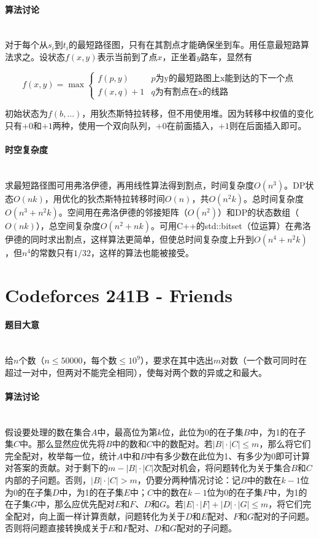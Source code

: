 \documentclass[UTF8]{ctexart}
\newcommand{\myparagraph}[1]{\paragraph{#1}\mbox{}\\}
\theoremstyle{nonumberplain}
\begin{document}
		\myparagraph{算法讨论}
		
			对于每个从$s_i$到$t_i$的最短路径图，只有在其割点才能确保坐到车。用任意最短路算法求之。设状态$f(x,y)$表示当前到了点$x$，正坐着$y$路车，显然有
			
			$$f(x,y)=\max\left\{\begin{array}{lr}
				f(p,y) & p\mbox{为y的最短路图上x能到达的下一个点} \\
				f(x,q)+1 & q\mbox{为有割点在x的线路}
				\end{array}\right.$$
			
			初始状态为$f(b,...)$，用狄杰斯特拉转移，但不用使用堆。因为转移中权值的变化只有$+0$和$+1$两种，使用一个双向队列，$+0$在前面插入，$+1$则在后面插入即可。
		
		\myparagraph{时空复杂度}
		
			求最短路径图可用弗洛伊德，再用线性算法得到割点，时间复杂度$O(n^3)$。DP状态$O(nk)$，用优化的狄杰斯特拉转移时间$O(n)$，共$O(n^2k)$。总时间复杂度$O(n^3+n^2k)$。空间用在弗洛伊德的邻接矩阵（$O(n^2)$）和DP的状态数组（$O(nk)$），总空间复杂度$O(n^2+nk)$。可用C++的std::bitset（位运算）在弗洛伊德的同时求出割点，这样算法更简单，但使总时间复杂度上升到$O(n^4+n^2k)$，但$n^4$的常数只有$1/32$，这样的算法也能被接受。
	
	\section{Codeforces 241B - Friends}
	
		\myparagraph{题目大意}
		
			给$n$个数（$n \leq 50000$，每个数$\leq 10^9$），要求在其中选出$m$对数（一个数可同时在超过一对中，但两对不能完全相同），使每对两个数的异或之和最大。
		
		\myparagraph{算法讨论}
		
			假设要处理的数在集合$A$中，最高位为第$k$位，此位为0的在子集$B$中，为1的在子集$C$中。那么显然应优先将$B$中的数和$C$中的数配对。若$|B|\cdot|C|\leq m$，那么将它们完全配对，枚举每一位，统计$A$中和$B$中有多少数在此位为1、有多少为0即可计算对答案的贡献。对于剩下的$m-|B|\cdot|C|$次配对机会，将问题转化为关于集合$B$和$C$内部的子问题。否则，$|B|\cdot|C|>m$，仍要分两种情况讨论：记$B$中的数在$k-1$位为0的在子集$D$中，为1的在子集$E$中；$C$中的数在$k-1$位为0的在子集$F$中，为1的在子集$G$中，那么应优先配对$E$和$F$、$D$和$G$。若$|E|\cdot|F|+|D|\cdot|G|\leq m$，将它们完全配对，向上面一样计算贡献，问题转化为关于$D$和$E$配对、$F$和$G$配对的子问题。否则将问题直接转换成关于$E$和$F$配对、$D$和$G$配对的子问题。
			
\end{document}
